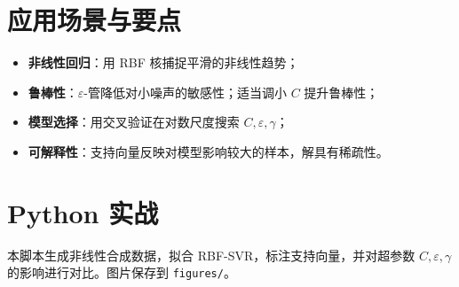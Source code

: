 \documentclass[UTF8,zihao=-4]{ctexart}
\begin{document}
\section{应用场景与要点}
\begin{itemize}
  \item \textbf{非线性回归}：用 RBF 核捕捉平滑的非线性趋势；
  \item \textbf{鲁棒性}：\(\varepsilon\)-管降低对小噪声的敏感性；适当调小 \(C\) 提升鲁棒性；
  \item \textbf{模型选择}：用交叉验证在对数尺度搜索 \(C,\varepsilon,\gamma\)；
  \item \textbf{可解释性}：支持向量反映对模型影响较大的样本，解具有稀疏性。
\end{itemize}

\section{Python 实战}
本脚本生成非线性合成数据，拟合 RBF-SVR，标注支持向量，并对超参数 \(C,\varepsilon,\gamma\) 的影响进行对比。图片保存到 \texttt{figures/}。
\end{document}
